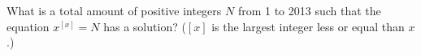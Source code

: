 \problem
What is a total amount of positive integers $N$ from 1 to 2013 such that
the equation $x^{[x]}=N$ has a solution?
($[x]$ is the largest integer less or equal than $x$.)

\solution

\endproblem
